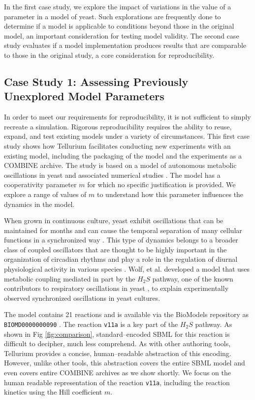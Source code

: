 \documentclass[10pt,letterpaper]{article}
\begin{document}
In the first case study, we explore the impact of variations in the value of a parameter in a model of yeast. Such explorations are frequently done to determine if a model is applicable to conditions beyond those in the original model, an important consideration for testing model validity. The second case study evaluates if a model implementation produces results that are comparable to those in the original study, a core consideration for reproducibility.

\subsection*{Case Study 1: Assessing Previously Unexplored Model Parameters}

In order to meet our requirements for reproducibility, it is not sufficient to simply recreate a simulation. Rigorous reproducibility requires the ability to reuse, expand, and test existing models under a variety of circumstances. This first case study shows how Tellurium facilitates conducting new experiments with an existing model, including the packaging of the model and the experiments as a COMBINE archive. The study is based on a model of autonomous metabolic oscillations in yeast and associated numerical studies \cite{wolf2001mathematical}. The model has a cooperativity parameter $m$ for which no specific justification is provided. We explore a range of values of $m$ to understand how this parameter influences the dynamics in the model.

When grown in continuous culture, yeast exhibit oscillations that can be maintained for months and can cause the temporal separation of many cellular functions in a synchronized way \cite{murray2007regulation}. This type of dynamics belongs to a broader class of coupled oscillators that are thought to be highly important in the organization of circadian rhythms and play a role in the regulation of diurnal physiological activity in various species \cite{winfree1967biological,dodd2005plant}.
Wolf, et al. \cite{wolf2001mathematical} developed a model that uses metabolic coupling mediated in part by the $H_2 S$ pathway, one of the known contributors to respiratory oscillations in yeast \cite{murray2007regulation}, to explain experimentally observed synchronized oscillations in yeast cultures.

The model contains 21 reactions and is available via the BioModels repository as \texttt{BIOMD0000000090} \cite{wolfbiomod}. The reaction \texttt{v11a} is a key part of the $H_2S$ pathway. As shown in Fig  \ref{fig:comparison}, standard--encoded SBML for this reaction is difficult to decipher, much less comprehend. As with other authoring tools, Tellurium provides a concise, human--readable abstraction of this encoding. However, unlike other tools, this abstraction covers the entire SBML model and even covers entire COMBINE archives as we show shortly. We focus on the human readable representation of the reaction \texttt{v11a}, including the reaction kinetics using the Hill coefficient $m$.
\end{document}
